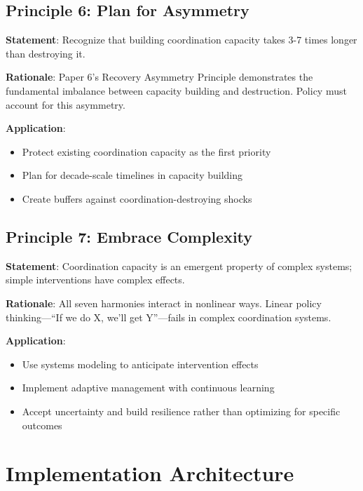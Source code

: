 \documentclass[12pt,letterpaper]{article}
\begin{document}
\subsection{Principle 6: Plan for Asymmetry}

\textbf{Statement}: Recognize that building coordination capacity takes 3-7 times longer than destroying it.

\textbf{Rationale}: Paper 6's Recovery Asymmetry Principle demonstrates the fundamental imbalance between capacity building and destruction. Policy must account for this asymmetry.

\textbf{Application}:
\begin{itemize}
    \item Protect existing coordination capacity as the first priority
    \item Plan for decade-scale timelines in capacity building
    \item Create buffers against coordination-destroying shocks
\end{itemize}

\subsection{Principle 7: Embrace Complexity}

\textbf{Statement}: Coordination capacity is an emergent property of complex systems; simple interventions have complex effects.

\textbf{Rationale}: All seven harmonies interact in nonlinear ways. Linear policy thinking---``If we do X, we'll get Y''---fails in complex coordination systems.

\textbf{Application}:
\begin{itemize}
    \item Use systems modeling to anticipate intervention effects
    \item Implement adaptive management with continuous learning
    \item Accept uncertainty and build resilience rather than optimizing for specific outcomes
\end{itemize}

\section{Implementation Architecture}
\end{document}
